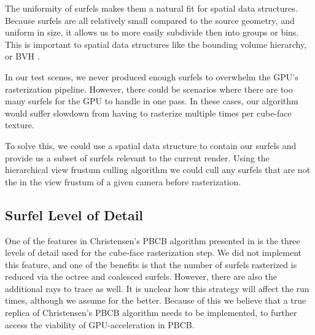 The uniformity of surfels makes them a natural fit for spatial data structures. Because surfels are all relatively small compared to the source geometry, and uniform in size, it allows us to more easily subdivide then into groups or bins. This is important to spatial data structures like the bounding volume hierarchy, or BVH \cite{bib:pbr}.

In our test scenes, we never produced enough surfels to overwhelm the GPU's rasterization pipeline. However, there could be scenarios where there are too many surfels for the GPU to handle in one pass. In these cases, our algorithm would suffer slowdown from having to rasterize multiple times per cube-face texture.

To solve this, we could use a spatial data structure to contain our surfels and provide us a subset of surfels relevant to the current render. Using the hierarchical view frustum culling algorithm \cite{bib:rtr} we could cull any surfels that are not the in the view frustum of a given camera before rasterization.

\subsection{Surfel Level of Detail}
\label{sec:surfel_lod}
One of the features in Christensen's PBCB algorithm presented in \cite{bib:christensen2008} is the three levels of detail used for the cube-face rasterization step. We did not implement this feature, and one of the benefits is that the number of surfels rasterized is reduced via the octree and coalesced surfels. However, there are also the additional rays to trace as well. It is unclear how this strategy will affect the run times, although we assume for the better. Because of this we believe that a true replica of Christensen's PBCB algorithm needs to be implemented, to further access the viability of GPU-acceleration in PBCB.

